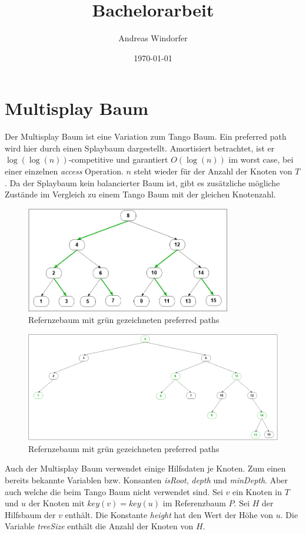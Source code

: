 \documentclass[a4paper,12pt]{article}
\title{Bachelorarbeit}
\author{
	Andreas Windorfer\\
}
\date{\today}
\begin{document}
\maketitle
\newpage

\newpage
\tableofcontents


\newpage


\section{Multisplay Baum}
Der Multisplay Baum ist eine Variation zum Tango Baum. Ein preferred path wird hier durch einen Splaybaum dargestellt. Amortisiert betrachtet, ist er $\log\left(\log\left(n\right)\right)$-competitive und garantiert $O\left(\log \left(n\right)\right)$ im worst case, bei einer einzelnen {\textit{access}} Operation. $n$ steht wieder für der Anzahl der Knoten von $T$. Da der Splaybaum kein balancierter Baum ist, gibt es zusätzliche mögliche Zustände im Vergleich zu einem Tango Baum mit der gleichen Knotenzahl.
\begin{figure}[h]
	\centering
	\includegraphics[width= 0.8\textwidth]{"Medien/Multisplay/referenzTree"}
	\caption {Refernzebaum mit grün gezeichneten preferred paths }
	\label{fig:referenzTree}
\end{figure} 
\begin{figure}[h]
	\centering
	\includegraphics[width= 1\textwidth]{"Medien/Multisplay/pfadRepresentation"}
	\caption {Refernzebaum mit grün gezeichneten preferred paths }
	\label{fig:referenzTree}
\end{figure} 
Auch der Multisplay Baum verwendet einige Hilfsdaten je Knoten. Zum einen bereits bekannte Variablen bzw. Konsanten \textit{isRoot}, \textit{depth} und \textit{minDepth}. Aber auch welche die beim Tango Baum nicht verwendet sind. Sei $v$ ein Knoten in $T$ und $u$ der Knoten mit $\mathit{key}\left(v\right) = \mathit{key}\left(u\right)$ im Referenzbaum $P$. Sei $H$ der Hilfsbaum der $v$ enthält. Die Konstante \textit{height} hat den Wert der Höhe von $u$. Die Variable \textit{treeSize} enthält die Anzahl der Knoten von $H$.   
\end{document}
